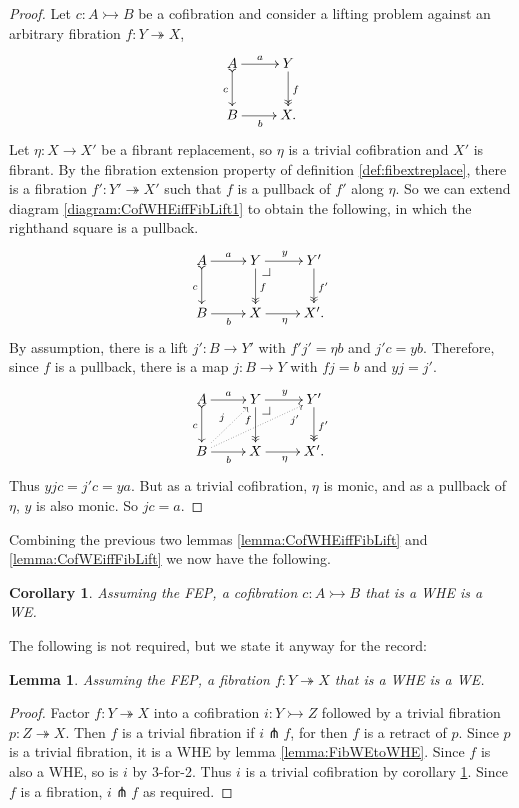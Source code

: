 \documentclass[12pt]{article}
\makeatletter
\newcommand{\mono}{\ensuremath{\rightarrowtail}}
\newcommand{\ra}{\ensuremath{\rightarrow}}
\newcommand{\onto}{\ensuremath{\twoheadrightarrow}}
\newtheorem{lemma}[theorem]{Lemma}
\newtheorem{corollary}[theorem]{Corollary}
\theoremstyle{remark}
\theoremstyle{definition}
\newcommand{\pbcorner}[1][dr]{\save*!/#1-1.2pc/#1:(-1,1)@^{|-}\restore}
\makeatother
\begin{document}
\begin{proof}
Let $c : A\mono B$ be a cofibration and consider a lifting problem against an arbitrary fibration $f: Y\onto X$,
\begin{equation}\label{diagram:CofWHEiffFibLift1}
\xymatrix{
A \ar@{>->}[d]_{c} \ar[r]^-{a}  & Y \ar@{>>}[d]^{f} \\
B \ar[r]_{b} &  X.
}
\end{equation}
Let $\eta: X\ra X'$ be a fibrant replacement, so $\eta$ is a trivial cofibration and $X'$ is fibrant. 
By the fibration extension property of definition \ref{def:fibextreplace}, there is a fibration $f' : Y' \onto X'$ such that $f$ is a pullback of $f'$ along $\eta$. So we can extend diagram \eqref{diagram:CofWHEiffFibLift1} to obtain the following, in which the righthand square is a pullback.
\begin{equation}\label{diagram:CofWHEiffFibLift2}
\xymatrix{
A \ar@{>->}[d]_{c} \ar[r]^-{a}  & Y \ar@{>>}[d]^{f} {\pbcorner} \ar[r]^{y} & Y' \ar@{>>}[d]^{f'} \\
B \ar[r]_{b} &  X  \ar[r]_\eta &  X'.
}
\end{equation}
By assumption, there is a lift $j' : B\ra Y'$ with $f' j' = \eta b$ and $j'c = yb$.  Therefore, since $f$ is a pullback, there is a map $j : B\ra Y$ with $fj = b$ and $y j = j'$.  
\begin{equation}\label{diagram:CofWHEiffFibLift2}
\xymatrix{
A \ar@{>->}[d]_{c} \ar[r]^-{a}  & Y \ar@{>>}[d]_<<<<{f} {\pbcorner} \ar[r]^{y} & Y' \ar@{>>}[d]^{f'} \\
B \ar[r]_{b} \ar@{..>}[ru]^{j} \ar@{..>}[rru]_>>>>{j'} &  X  \ar[r]_\eta &  X'.
}
\end{equation}
Thus $yjc = j'c = ya$.  But as a trivial cofibration, $\eta$ is monic, and as a pullback of $\eta$, $y$ is also monic. So $jc=a$.
\end{proof}

Combining the previous two lemmas \ref{lemma:CofWHEiffFibLift} and \ref{lemma:CofWEiffFibLift} we now have the following.

\begin{corollary}\label{cor:CofWHEtoWE}
Assuming the FEP,  a cofibration $ c : A \mono B$ that is a WHE is a WE.
\end{corollary}

The following is not required, but we state it anyway for the record:

\begin{lemma}\label{lemma:FibWHEtoWE}
Assuming the FEP, a fibration $ f : Y \onto X$ that is a WHE is a WE.
\end{lemma}
\begin{proof}
Factor $ f : Y \onto X$ into a cofibration $i : Y\mono Z$ followed by a trivial fibration $p: Z\onto X$.  Then $f$ is a trivial fibration if $i\pitchfork f$, for then $f$ is a retract of $p$.  Since $p$ is a trivial fibration, it is a WHE by lemma \ref{lemma:FibWEtoWHE}.  Since $f$ is also a WHE, so is $i$ by 3-for-2.  Thus $i$ is a trivial cofibration by corollary \ref{cor:CofWHEtoWE}. Since $f$ is a fibration, $i\pitchfork f$ as required.
\end{proof}
\end{document}
